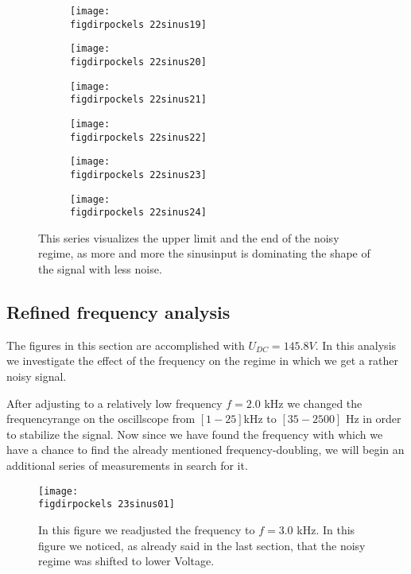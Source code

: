 \begin{figure}
    \begin{subfigure}[b]{\picwidth}
        \texttt{[image: \\figdirpockels 22sinus19]}
        \caption{}
    \end{subfigure}\qquad
    \begin{subfigure}[b]{\picwidth}
        \texttt{[image: \\figdirpockels 22sinus20]}
        \caption{}
    \end{subfigure}
    \begin{subfigure}[b]{\picwidth}
        \texttt{[image: \\figdirpockels 22sinus21]}
        \caption{}
    \end{subfigure}
    \begin{subfigure}[b]{\picwidth}
        \texttt{[image: \\figdirpockels 22sinus22]}
        \caption{}
    \end{subfigure}
    \begin{subfigure}[b]{\picwidth}
        \texttt{[image: \\figdirpockels 22sinus23]}
        \caption{}
    \end{subfigure}
    \begin{subfigure}[b]{\picwidth}
        \texttt{[image: \\figdirpockels 22sinus24]}
        \caption{}
    \end{subfigure}

    \caption{This series visualizes the upper limit and the end
        of the noisy regime, as more and more the sinusinput
        is dominating the shape of the signal with less noise.}
    \label{fig:sinus4}
\end{figure}
\clearpage
\subsection{Refined frequency analysis}
The figures in this section are accomplished with $U_{DC}=145.8 V$.
In this analysis we investigate the effect of the frequency
on the regime in which we get a rather noisy signal. 

After
adjusting to a relatively low frequency $f=2.0$ kHz we changed
the frequencyrange on the oscillscope from 
$[1 - 25]$kHz to $[35 - 2500]$ Hz in order to stabilize the signal.
Now since we have found the frequency with which we have a chance
to find the already mentioned frequency-doubling, we will
begin an additional series of measurements in search for it. 

\begin{figure}
    \texttt{[image: \\figdirpockels 23sinus01]}
    \caption{In this figure we readjusted the frequency to
        $f=3.0$ kHz. In this figure we noticed, as already said
        in the last section, that the noisy regime was shifted
        to lower Voltage.}
\end{figure}

